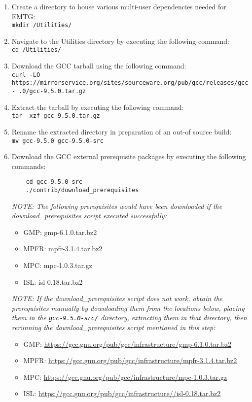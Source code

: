 \begin{enumerate}
	\item Create a directory to house various multi-user dependencies needed for EMTG: \\ 

	\texttt{mkdir /Utilities/}
	\item Navigate to the Utilities directory by executing the following command: \\

	\texttt{cd /Utilities/}
	\item Download the \ac{GCC} tarball using the following command: \\
	
	\texttt{curl -LO https://mirrorservice.org/sites/sourceware.org/pub/gcc/releases/gcc- \newline{}.0/gcc-9.5.0.tar.gz}
	
	\item Extract the tarball by executing the following command: \\
	
	\texttt{tar -xzf gcc-9.5.0.tar.gz}
	\item Rename the extracted directory in preparation of an out-of source build: \\
	
	\texttt{mv gcc-9.5.0 gcc-9.5.0-src}
	\item Download the \ac{GCC} external prerequisite packages by executing the following commands: \\ 
	\begin{verbatim}
	cd gcc-9.5.0-src
	./contrib/download_prerequisites
	\end{verbatim}
	
	\textit{NOTE: The following prerequisites would have been downloaded if the download\_prerequisites script executed successfully:}
	\begin{itemize}
		\item \ac{GMP}: gmp-6.1.0.tar.bz2
		\item \ac{MPFR}: mpfr-3.1.4.tar.bz2
		\item \ac{MPC}: mpc-1.0.3.tar.gz
		\item \ac{ISL}: isl-0.18.tar.bz2
	\end{itemize}
	
	\textit{NOTE: If the download\_prerequisites script does not work, obtain the prerequisites manually by downloading them from the locations below, placing them in the \texttt{gcc-9.5.0-src/} directory, extracting them in that directory, then rerunning the download\_prerequisites script mentioned in this step:}
	\begin{itemize}
		\item \ac{GMP}: \url{https://gcc.gnu.org/pub/gcc/infrastructure/gmp-6.1.0.tar.bz2}
		\item \ac{MPFR}: \url{https://gcc.gnu.org/pub/gcc/infrastructure/mpfr-3.1.4.tar.bz2}
		\item \ac{MPC}: \url{https://gcc.gnu.org/pub/gcc/infrastructure/mpc-1.0.3.tar.gz}
		\item \ac{ISL}: \url{https://gcc.gnu.org/pub/gcc/infrastructure//isl-0.18.tar.bz2}
	\end{itemize}
	

\end{enumerate}
